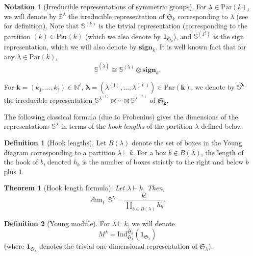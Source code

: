\documentclass{amsart}
\newtheorem{theorem}{Theorem}
\theoremstyle{definition}
\newtheorem{definition}{Definition}
\newtheorem{notation}{Notation}
\theoremstyle{remark}
\numberwithin{equation}{section}
\begin{document}
\begin{notation}[Irreducible representations of symmetric groups]
For $\lambda \in {\mathrm{Par}}(k)$, we will denote by $\mathbb{S}^{\lambda}$ the irreducible representation of 
$\mathfrak{S}_k$ corresponding to
$\lambda$ (see \cite{Procesi-book} for definition). 
Note that $\mathbb{S}^{(k)}$ is the trivial representation (corresponding to the  partition $(k) \in {\mathrm{Par}}(k)$
(which we also denote by $\mathbf{1}_{\mathfrak{S}_k}$), and 
$\mathbb{S}^{(1^k)}$ is the sign representation, which we will also denote by $\mathbf{sign}_k$.
It is  well known fact that for any $\lambda \in {\mathrm{Par}}(k)$, 
\[
\mathbb{S}^{(\tilde{\lambda})} \cong \mathbb{S}^{(\lambda)} \otimes \mathbf{sign}_k.
\]

For ${\mathbf{k}} = (k_1,\ldots,k_\ell) \in {\mathbb{N}}^\ell$, $\pmb{\lambda} = (\lambda^{(1)},\ldots,\lambda^{(\ell)}) \in {\mathrm{Par}}({\mathbf{k}})$, we denote by $\mathbb{S}^{\pmb{\lambda}}$ the irreducible representation 
$\mathbb{S}^{\lambda^{(1)}} \boxtimes \cdots \boxtimes \mathbb{S}^{\lambda^{(\ell)}}$ of $\mathfrak{S}_{\mathbf{k}}$.
\end{notation}

The following classical formula (due to Frobenius) gives the dimensions of the representations $\mathbb{S}^{\lambda}$ in terms of the \emph{hook lengths} of the partition $\lambda$ defined below.

\begin{definition}[Hook lengths]
Let $B(\lambda)$ denote the set of boxes in the  Young diagram corresponding to a partition 
$\lambda \vdash k$. For a box $b \in B(\lambda)$, the length of the hook of $b$, denoted 
$h_b$ is the number of boxes strictly to the right and below $b$ plus $1$.
\end{definition}

\begin{theorem}[Hook length formula]
\label{thm:hook}
Let $\lambda \vdash k$. Then,
\[
\dim_{\mathbb{F}} \mathbb{S}^{\lambda} =  \frac{k!}{\prod_{b \in B(\lambda)} h_b}.
\]
\end{theorem}

\begin{definition}[Young module]
\label{def:Young}
For $\lambda \vdash k$, we will denote 
\[
M^\lambda = {\mathrm{Ind}}_{\mathfrak{S}_\lambda}^{\mathfrak{S}_k} (\mathbf{1}_{\mathfrak{S}_\lambda})
\] 
(where $\mathbf{1}_{\mathfrak{S}_\lambda}$ denotes the trivial one-dimensional representation
of $\mathfrak{S}_\lambda$).
\end{definition}
\end{document}
